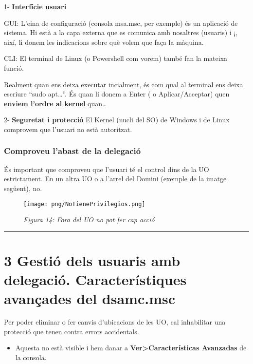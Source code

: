 \documentclass[
  a4paper,
]{article}
\providecommand{\tightlist}{%
  \setlength{\itemsep}{0pt}\setlength{\parskip}{0pt}}
\begin{document}
1- \textbf{Interfície usuari}

GUI: L'eina de configuració (consola msa.msc, per exemple) és un
aplicació de sistema. Hi està a la capa externa que es comunica amb
nosaltres (usuaris) i ¡, així, li donem les indicacions sobre què volem
que faça la màquina.

CLI: El terminal de Linux (o Powershell com vorem) també fan la mateixa
funció.

Realment quan ens deixa executar incialment, és com qual al terminal ens
deixa escriure ``sudo apt\ldots{}''. És quan li donem a Enter ( o
Aplicar/Acceptar) quen \textbf{enviem l'ordre al kernel} quan\ldots{}

2- \textbf{Seguretat i protecció} El Kernel (nucli del SO) de Windows i
de Linux comprovem que l'usuari no està autoritzat.

\subsubsection{Comproveu l'abast de la
delegació}\label{comproveu-labast-de-la-delegaciuxf3}

És important que comproveu que l'usuari té el control dins de la UO
estrictament. En un altra UO o a l'arrel del Domini (exemple de la
imatge següent), no.

\begin{figure}
\centering
\texttt{[image: png/NoTienePrivilegios.png]}
\caption{\emph{Figura 14: Fora del UO no pot fer cap acció}}
\end{figure}

\begin{center}\rule{0.5\linewidth}{0.5pt}\end{center}

\section{3 Gestió dels usuaris amb delegació. Característiques avançades
del
dsamc.msc}\label{gestiuxf3-dels-usuaris-amb-delegaciuxf3.-caracteruxedstiques-avanuxe7ades-del-dsamc.msc}

Per poder eliminar o fer canvis d'ubicacions de les UO, cal inhabilitar
una protecció que tenen contra errors accidentals.

\begin{itemize}
\tightlist
\item
  Aquesta no està visible i hem danar a
  \textbf{Ver\textgreater Características Avanzadas} de la consola.
\end{itemize}
\end{document}
